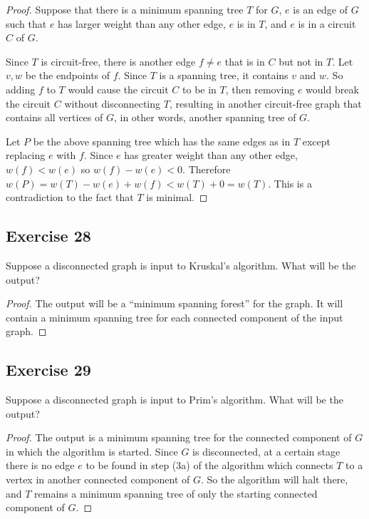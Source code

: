 \documentclass[14pt]{extarticle}
\begin{document}
\begin{proof}
    Suppose that there is a minimum spanning tree \(T\) for \(G\), \(e\) is an edge of \(G\) such that \(e\) has larger weight
    than any other edge, \(e\) is in \(T\), and \(e\) is in a circuit \(C\) of \(G\).

    Since \(T\) is circuit-free, there is another edge \(f \neq e\) that is in \(C\) but not in \(T\). Let \(v, w\) be the
    endpoints of \(f\). Since \(T\) is a spanning tree, it contains \(v\) and \(w\). So adding \(f\) to \(T\) would cause
    the circuit \(C\) to be in \(T\), then removing \(e\) would break the circuit \(C\) without disconnecting \(T\), resulting
    in another circuit-free graph that contains all vertices of \(G\), in other words, another spanning tree of \(G\).

    Let \(P\) be the above spanning tree which has the same edges as in \(T\) except replacing \(e\) with \(f\). Since \(e\) has
    greater weight than any other edge, \(w(f) < w(e)\) so \(w(f) - w(e) < 0\). Therefore \(w(P) = w(T) - w(e) + w(f) < w(T) + 0
    = w(T)\). This is a contradiction to the fact that \(T\) is minimal.
\end{proof}

\subsection{Exercise 28}
Suppose a disconnected graph is input to Kruskal’s algorithm. What will be the output?

\begin{proof}
    The output will be a “minimum spanning forest” for the graph. It will contain a minimum spanning tree for each connected
    component of the input graph.
\end{proof}

\subsection{Exercise 29}
Suppose a disconnected graph is input to Prim’s algorithm. What will be the output?

\begin{proof}
    The output is a minimum spanning tree for the connected component of \(G\) in which the algorithm is started. Since
    \(G\) is disconnected, at a certain stage there is no edge \(e\) to be found in step (3a) of the algorithm which connects
    \(T\) to a vertex in another connected component of \(G\). So the algorithm will halt there, and \(T\) remains a minimum
    spanning tree of only the starting connected component of \(G\).
\end{proof}
\end{document}
